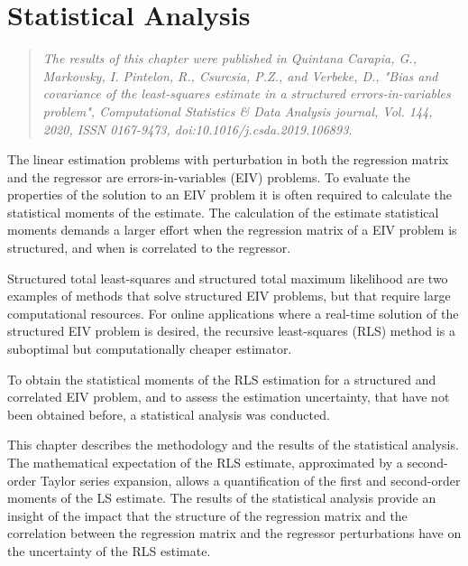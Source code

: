 
\glsresetall

\chapter{Statistical Analysis} \label{chap:StatisticalAnalysis}

\begin{quote}
\emph{The results of this chapter were published in Quintana Carapia, G., Markovsky, I. Pintelon, R., Csurcsia, P.Z., and Verbeke, D., "Bias and covariance of the least-squares estimate in a structured errors-in-variables problem", Computational Statistics & Data Analysis journal, Vol. 144, 2020, ISSN 0167-9473, doi:10.1016/j.csda.2019.106893. \nocite{QuintanaCSDA} }\vfill{}
\end{quote}


\vfill{}


The linear estimation problems with perturbation in both the regression matrix and the regressor are errors-in-variables (EIV) problems.
To evaluate the properties of the solution to an EIV problem it is often required to calculate the statistical moments of the estimate.
The calculation of the estimate statistical moments demands a larger effort when the regression matrix of a EIV problem is structured, and when is correlated to the regressor.

Structured total least-squares and structured total maximum likelihood are two examples of methods that solve structured EIV problems, but that require large computational resources.
For online applications where a real-time solution of the structured EIV problem is desired, the recursive least-squares (RLS) method is a suboptimal but computationally cheaper estimator.

To obtain the statistical moments of the RLS estimation for a structured and correlated EIV problem, and to assess the estimation uncertainty, that have not been obtained before, a statistical analysis was conducted.

This chapter describes the methodology and the results of the statistical analysis.
The mathematical expectation of the RLS estimate, approximated by a second-order Taylor series expansion, allows a quantification of the first and second-order moments of the LS estimate.
The results of the statistical analysis provide an insight of the impact that the structure of the regression matrix and the correlation between the regression matrix and the regressor perturbations have on the uncertainty of the RLS estimate.

